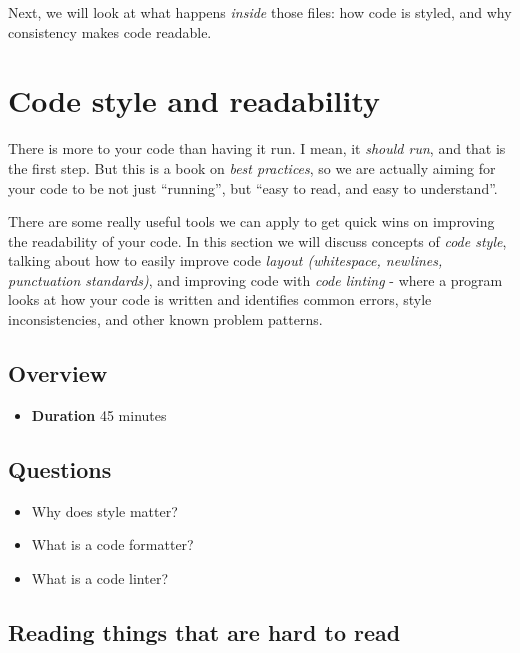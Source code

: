 \documentclass[
  letterpaper,
  justified,
  a4paper]{tufte-book}
\providecommand{\tightlist}{%
  \setlength{\itemsep}{0pt}\setlength{\parskip}{0pt}}
\providecommand{\tightlist}{%
  \setlength{\itemsep}{0pt}\setlength{\parskip}{0pt}}
\begin{document}
Next, we will look at what happens \emph{inside} those files: how code
is styled, and why consistency makes code readable.


\chapter{Code style and readability}\label{code-style-and-readability-1}

There is more to your code than having it run. I mean, it \emph{should
run}, and that is the first step. But this is a book on \emph{best
practices}, so we are actually aiming for your code to be not just
``running'', but ``easy to read, and easy to understand''.

There are some really useful tools we can apply to get quick wins on
improving the readability of your code. In this section we will discuss
concepts of \emph{code style}, talking about how to easily improve code
\emph{layout (whitespace, newlines, punctuation standards)}, and
improving code with \emph{code linting} - where a program looks at how
your code is written and identifies common errors, style
inconsistencies, and other known problem patterns.

\section{Overview}\label{overview-1}

\begin{itemize}
\tightlist
\item
  \textbf{Duration} 45 minutes
\end{itemize}

\section{Questions}\label{questions}

\begin{itemize}
\tightlist
\item
  Why does style matter?
\item
  What is a code formatter?
\item
  What is a code linter?
\end{itemize}

\section{Reading things that are hard to
read}\label{reading-things-that-are-hard-to-read}
\end{document}
